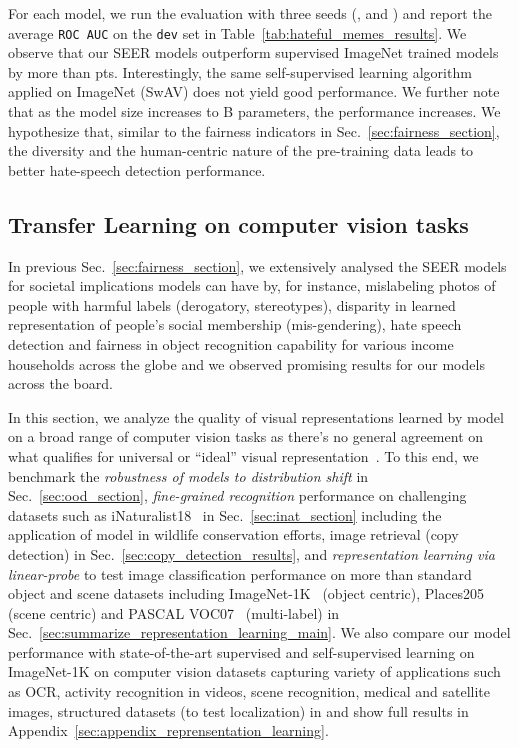 \documentclass[10pt,twocolumn,letterpaper]{article}
\newcommand{\ImNet}{ImageNet-1K\xspace}
\newcommand{\Places}{Places205\xspace}
\newcommand{\inat}{iNaturalist18\xspace}
\newcommand{\VOCseven}{VOC07\xspace}
\newcommand{\seer}{SEER\xspace}
\newcommand{\swav}{SwAV\xspace}
\begin{document}
For each model, we run the evaluation with three seeds (,  and ) and report the average \texttt{ROC AUC} on the \texttt{dev} set in Table~\ref{tab:hateful_memes_results}. 
We observe that our \seer models outperform supervised ImageNet trained models by more than  pts.
Interestingly, the same self-supervised learning algorithm applied on ImageNet (\swav) does not yield good performance.
We further note that as the model size increases to B parameters, the performance increases.
We hypothesize that, similar to the fairness indicators in Sec.~\ref{sec:fairness_section}, the diversity and the human-centric nature of the pre-training data leads to better hate-speech detection performance.



\subsection{Transfer Learning on computer vision tasks}
\label{sec:transfer_learning_section}

In previous Sec.~\ref{sec:fairness_section}, we extensively analysed the SEER models for societal implications models can have by, for instance, mislabeling photos of people with harmful labels (derogatory, stereotypes), disparity in learned representation of people's social membership (\eg mis-gendering), hate speech detection and fairness in object recognition capability for various income households across the globe and we observed promising results for our models across the board.

In this section, we analyze the quality of visual representations learned by model on a broad range of computer vision tasks as there's no general agreement on what qualifies for universal or ``ideal'' visual representation~\cite{locatello2020}. To this end, we benchmark the \textit{robustness of models to distribution shift} in Sec.~\ref{sec:ood_section}, \textit{fine-grained recognition} performance on challenging datasets such as \inat~\cite{van2018inaturalist} in Sec.~\ref{sec:inat_section} including the application of model in wildlife conservation efforts, image retrieval (copy detection) in Sec.~\ref{sec:copy_detection_results}, and \textit{representation learning via linear-probe} to test image classification performance on more than  standard object and scene datasets including \ImNet~\cite{olga2015imagenet} (object centric), \Places~\cite{places2014} (scene centric) and PASCAL \VOCseven~\cite{everingham2010pascal} (multi-label) in Sec.~\ref{sec:summarize_representation_learning_main}. We also compare our model performance with state-of-the-art supervised and self-supervised learning on \ImNet on computer vision datasets capturing variety of applications such as OCR, activity recognition in videos, scene recognition, medical and satellite images, structured datasets (to test localization) in and show full results in Appendix~\ref{sec:appendix_reprensentation_learning}.
\end{document}
